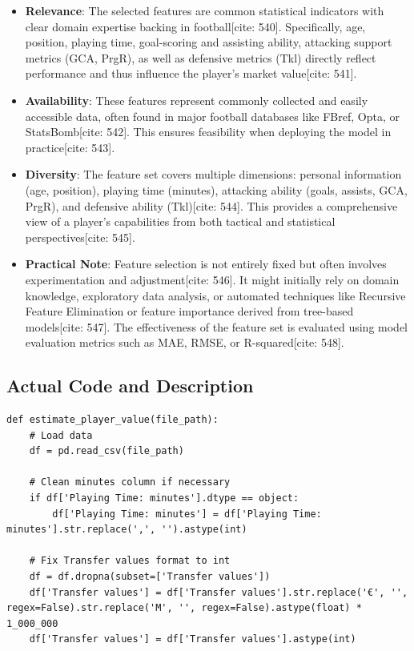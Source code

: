 \documentclass[12pt]{report}
\begin{document}
{{{\begin{itemize}
    \item \textbf{Relevance}: The selected features are common statistical indicators with clear domain expertise backing in football[cite: 540]. Specifically, age, position, playing time, goal-scoring and assisting ability, attacking support metrics (GCA, PrgR), as well as defensive metrics (Tkl) directly reflect performance and thus influence the player's market value[cite: 541].
    \item \textbf{Availability}: These features represent commonly collected and easily accessible data, often found in major football databases like FBref, Opta, or StatsBomb[cite: 542]. This ensures feasibility when deploying the model in practice[cite: 543].
    \item \textbf{Diversity}: The feature set covers multiple dimensions: personal information (age, position), playing time (minutes), attacking ability (goals, assists, GCA, PrgR), and defensive ability (Tkl)[cite: 544]. This provides a comprehensive view of a player's capabilities from both tactical and statistical perspectives[cite: 545].
    \item \textbf{Practical Note}: Feature selection is not entirely fixed but often involves experimentation and adjustment[cite: 546]. It might initially rely on domain knowledge, exploratory data analysis, or automated techniques like Recursive Feature Elimination or feature importance derived from tree-based models[cite: 547]. The effectiveness of the feature set is evaluated using model evaluation metrics such as MAE, RMSE, or R-squared[cite: 548].
\end{itemize}
\subsection{Actual Code and Description}
\begin{lstlisting}
def estimate_player_value(file_path):
    # Load data
    df = pd.read_csv(file_path)

    # Clean minutes column if necessary
    if df['Playing Time: minutes'].dtype == object:
        df['Playing Time: minutes'] = df['Playing Time: minutes'].str.replace(',', '').astype(int)

    # Fix Transfer values format to int
    df = df.dropna(subset=['Transfer values'])
    df['Transfer values'] = df['Transfer values'].str.replace('€', '', regex=False).str.replace('M', '', regex=False).astype(float) * 1_000_000
    df['Transfer values'] = df['Transfer values'].astype(int)


\end{lstlisting}}}}
\end{document}
